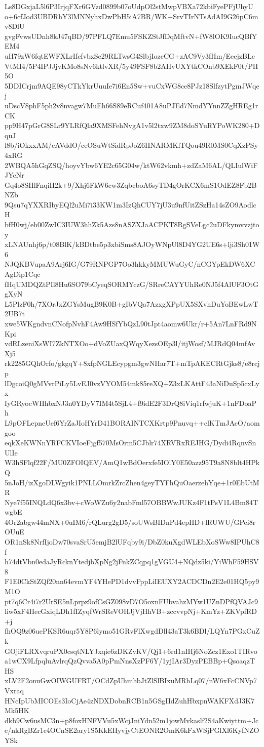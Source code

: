 Ls8DGxjaL5l6P3IrjqFXr6GVzd0899b07oUdpOl2stMwpVBXa72kbiFyePFjUhyU
o+6cfJod3UBDRhY3lMNNyhxDwPbH5iA7BR/WK+SrvTIrNTsAdAI9G26pC6mv8DlU
gvgFvwsUDnh8kJ47qBD/97PFLQ7Emu5FSKZStJfDqMftvN+fW8lOK9IucQBfYEM4
uH79zW6fqtEWFXLrIfcfvbxSc29RLTwsG4SlbjIozcCG+zAC9Vy3fHm/EeejzBLc
VtMI4/5P4IPJJjvKMo8sNv6ktlvXR/5y49FSF8b2AHvUXYtkCOnb9XEkF0t/PH5O
5DDICrjm9AQE98yCTkYkrUuuIe7i6En5Sw+vuCxWG8ce8PJz18SlfzytPgmJWqej
uDscV8phF5ph2v8nvagw7MuEh66S89eRCuf401A8uPJEd7NmdYYnnZZgHREg1rCK
pp9H47pGrG8SLr9YLRfQla9XMSFehNvgA1v5l2txw9ZM8doSYuRYPoWK280+DquJ
l8b/iOkxxAM/cAVddO/ceOSuWtSidRpJoZ6HNARMKlTQou49R0MS0CqXzPSy4xRG
2WBQA5hGqZSQ/hoyvYbw6YE2c65G04w/ktW62vkmh+zdZaM6AL/QLIulWiFJYcNr
Gq4o8SHlFnqiH2k+9/Xhj6FkW6cw3ZqbcboA6syTD4gOrKCX6mS1OdEZ8Fb2BNZb
9Qsu7qYXXRIbyEQl2uMi7i33KW1m3IzQhCUY7jU3u9nfUitZSzHa14sZO9AodlcH
bfH0wj/eh00ZwIC3IUW3hhZk5Azs8nASZXJaACPKT8RgSVeLgc2uDFkymvvzjtoy
xLNAUnhj6p/t08BlK/kBDtbe5p3xbiSms8AJOyWNpUl8D4YG2UE6s+lji3Sh01W6
NJQKBVupaA9Arj6IG/G79RNPGP7Oo3hkkyMMUWuGyC/nCGYpEkDW6XCAgDip1Cqc
fHqUMDQZtPIl8Hu6SO79bCyeqSORMYczG/SRreCAYYUhRe0NJ5f4AlUF3OtGgXyN
L5PlzF0h/7XOrJxZGYsMugB9K0B+gIbVQa7AzxgXPpUX5SXvhDuYoBEwLwT2UB7t
xwe5WKgndvnCNofpNvhF4Aw9HSfYbQzL90tJpt4aomw6Ukr/r+5An7LnFRd9NKpi
vdRLzeniXsWI7ZkNTXOo+dVoZUaxQWqyXezsOEp3l/itjWosf/MJRdQ04mfAvXj5
rk2285GQhOrfo/gkgqY+8xfpNGLEcypgm3gwNHar7T+mTpAKECRtGjks8/e8rcjp
lDgcoiQ0gMVvrPiLy5LvEJ0vzVYOM54mk85reXQ+Z3xLKAttF43aNiDuSp5cxLyx
IyGRyocWHhbxNJ3n0YDyV7IM4t5SjL4+f9idE2F3DrQ8iViq1rfwjuK+1nFDoaPh
L9pOFLepneUef6YrZaJIoHYrD41BORAINTCXKrtp9Pnuvq++clKTmJAcO/aomgoo
eqkXeKWNnYRFCKVIoeFjgf570MsOrm5CJblr74XRVRxREJHG/Dydi4RqnvSnUlIe
W3hSFlqf22F/MU0ZFOIQEV/AmQ1wBdOerxfe5IOlY0E50azz95T9a8N8blt4HPkQ
5nJoH/izXgoDLWgyik1PNLLOmrkZrcZhen4geyTYFhQuOaerzehYqe+1r0EbUtMR
Nye7f55INQLdQ6x3bv+cWoWZu6y2nabFml57OBBWwJUKz4F1tPsV1L4Bm84TwgbE
4Or2abgw44mNX+0uIM6/rQLurg2gD5/soUWsBIDnPd4epHD+lRUWU/GPei8rOUuE
OR1nSk8NrfIjoDw70svaSrU5emjB2lUFqby9i/DbZ0kuXgdWLEbXoSWw8IPUhC8f
h74dtVbn0edaJyRcknYtedjbXpNg2jFnkZCqpq1gVGU4+NQdz5ki/YiWhF59HSV8
F1E0CkStZQf20nn64evmYF4YHePD1dvvFppLiIEUXY2ACDCDn2E2e01HQ5py9M1O
pt7q6Cr4i7r2UrSE5nLprpz9ofCsGZ098vD7O5oxnFUbvahzMYw1UZnDPfQVAJc9
liw5xF4HecGxiqLDh1fIZyqfWrSReVOHJjVjHhVB+zccvvpNj+KmYz+ZKVpfRD+j
fhOQ9z06uePKSR6uqr5Y8P6lymo51GRvFlXwgdDll43aT3k6BDl/LQYn7PGxCuZk
GOjiFLRXvqruPX0csqtNLYJxqie6zDKZvKV/Qj1+6rd1nIHj6NoZcz1Exo1TIRvo
a1wCX9LfpqluAvlrqQzQvva5A0pPmNnsXzPF6Y/1yjIAr3DyzPEBBp+QsoaqzTHS
xLV2F2onuGwOIWGUFRT/OCdZpUhmhbJtZlSlBIxuMRhLq07/nW6xFcCNVp7Vxraq
HNcIpUbMICOEs3IoCjAe4zNDXDobnRCB1n5GSgIIdZuhHbxpnWAKFXdJ3K7Mk5HK
dkb9Cw6usMC3n+p8foxHNFVVu5xWcjJniYdn52m1jowMvkaslf2S4aKwiyttm+Jc
e/nkRgBZr1c4OCnSE2ary1S5KkEHyvjyCtEONR2OmK6kFxWSjPGlXl6KyfNZOYSk
